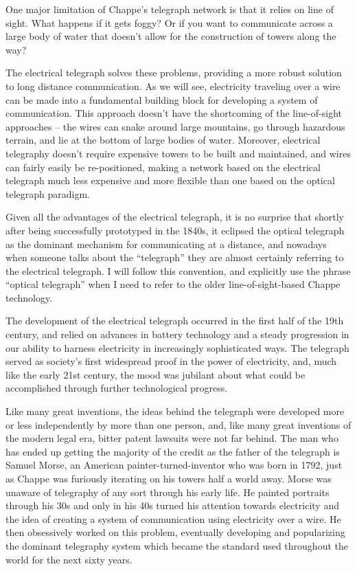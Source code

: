 \documentclass[UTF8]{book}
\begin{document}
\begin{CJK}{UTF8}{gbsn}
One major limitation of Chappe's telegraph network is that it relies on line of sight. What happens if it gets foggy? Or if you want to communicate across a large body of water that doesn't allow for the construction of towers along the way?

The electrical telegraph solves these problems, providing a more robust solution to long distance communication. As we will see, electricity traveling over a wire can be made into a fundamental building block for developing a system of communication. This approach doesn't have the shortcoming of the line-of-sight approaches – the wires can snake around large mountains, go through hazardous terrain, and lie at the bottom of large bodies of water. Moreover, electrical telegraphy doesn't require expensive towers to be built and maintained, and wires can fairly easily be re-positioned, making a network based on the electrical telegraph much less expensive and more flexible than one based on the optical telegraph paradigm.

Given all the advantages of the electrical telegraph, it is no surprise that shortly after being successfully prototyped in the 1840s, it eclipsed the optical telegraph as the dominant mechanism for communicating at a distance, and nowadays when someone talks about the ``telegraph'' they are almost certainly referring to the electrical telegraph. I will follow this convention, and explicitly use the phrase ``optical telegraph'' when I need to refer to the older line-of-sight-based Chappe technology.

The development of the electrical telegraph occurred in the first half of the 19th century, and relied on advances in battery technology and a steady progression in our ability to harness electricity in increasingly sophisticated ways. The telegraph served as society's first widespread proof in the power of electricity, and, much like the early 21st century, the mood was jubilant about what could be accomplished through further technological progress.

Like many great inventions, the ideas behind the telegraph were developed more or less independently by more than one person, and, like many great inventions of the modern legal era, bitter patent lawsuits were not far behind. The man who has ended up getting the majority of the credit as the father of the telegraph is Samuel Morse, an American painter-turned-inventor who was born in 1792, just as Chappe was furiously iterating on his towers half a world away. Morse was unaware of telegraphy of any sort through his early life. He painted portraits through his 30s and only in his 40s turned his attention towards electricity and the idea of creating a system of communication using electricity over a wire. He then obsessively worked on this problem, eventually developing and popularizing the dominant telegraphy system which became the standard used throughout the world for the next sixty years.


\end{CJK}
\end{document}
